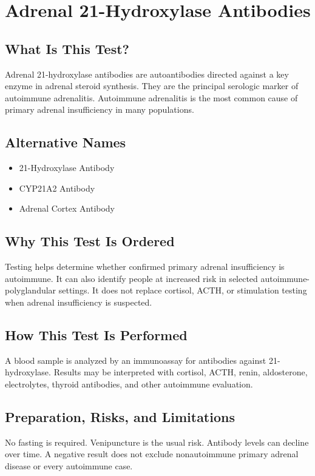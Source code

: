 \chapter{Adrenal 21-Hydroxylase Antibodies}

\section*{What Is This Test?}
Adrenal 21-hydroxylase antibodies are autoantibodies directed against a key enzyme in adrenal steroid synthesis. They are the principal serologic marker of autoimmune adrenalitis. Autoimmune adrenalitis is the most common cause of primary adrenal insufficiency in many populations.

\section*{Alternative Names}
\begin{itemize}
  \item 21-Hydroxylase Antibody
  \item CYP21A2 Antibody
  \item Adrenal Cortex Antibody
\end{itemize}
\section*{Why This Test Is Ordered}
Testing helps determine whether confirmed primary adrenal insufficiency is autoimmune. It can also identify people at increased risk in selected autoimmune-polyglandular settings. It does not replace cortisol, ACTH, or stimulation testing when adrenal insufficiency is suspected.

\section*{How This Test Is Performed}
A blood sample is analyzed by an immunoassay for antibodies against 21-hydroxylase. Results may be interpreted with cortisol, ACTH, renin, aldosterone, electrolytes, thyroid antibodies, and other autoimmune evaluation.

\section*{Preparation, Risks, and Limitations}
No fasting is required. Venipuncture is the usual risk. Antibody levels can decline over time. A negative result does not exclude nonautoimmune primary adrenal disease or every autoimmune case.

